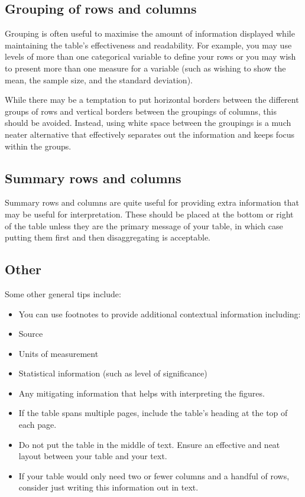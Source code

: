 \documentclass[
]{book}
\providecommand{\tightlist}{%
  \setlength{\itemsep}{0pt}\setlength{\parskip}{0pt}}
\begin{document}
\hypertarget{grouping-of-rows-and-columns}{%
\subsection{Grouping of rows and columns}\label{grouping-of-rows-and-columns}}

Grouping is often useful to maximise the amount of information displayed while maintaining the table's effectiveness and readability. For example, you may use levels of more than one categorical variable to define your rows or you may wish to present more than one measure for a variable (such as wishing to show the mean, the sample size, and the standard deviation).

While there may be a temptation to put horizontal borders between the different groups of rows and vertical borders between the groupings of columns, this should be avoided. Instead, using white space between the groupings is a much neater alternative that effectively separates out the information and keeps focus within the groups.

\hypertarget{summary-rows-and-columns}{%
\subsection{Summary rows and columns}\label{summary-rows-and-columns}}

Summary rows and columns are quite useful for providing extra information that may be useful for interpretation. These should be placed at the bottom or right of the table unless they are the primary message of your table, in which case putting them first and then disaggregating is acceptable.

\hypertarget{other}{%
\subsection{Other}\label{other}}

Some other general tips include:

\begin{itemize}
\tightlist
\item
  You can use footnotes to provide additional contextual information including:
\item
  Source
\item
  Units of measurement
\item
  Statistical information (such as level of significance)
\item
  Any mitigating information that helps with interpreting the figures.
\item
  If the table spans multiple pages, include the table's heading at the top of each page.
\item
  Do not put the table in the middle of text. Ensure an effective and neat layout between your table and your text.
\item
  If your table would only need two or fewer columns and a handful of rows, consider just writing this information out in text.
\end{itemize}
\end{document}
